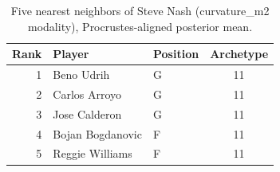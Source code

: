 \begin{table}[htbp]
  \centering\small
  \begin{tabular}{rllc}
    \toprule
    Rank & Player & Position & Archetype \\
    \midrule
    1 & Beno Udrih & G & 11 \\
    2 & Carlos Arroyo & G & 11 \\
    3 & Jose Calderon & G & 11 \\
    4 & Bojan Bogdanovic & F & 11 \\
    5 & Reggie Williams & F & 11 \\
    \bottomrule
  \end{tabular}
  \caption{Five nearest neighbors of Steve Nash (curvature_m2 modality), Procrustes-aligned posterior mean.}
  \label{tab:Steve_Nash_neighbors_curvature_m2}
\end{table}

